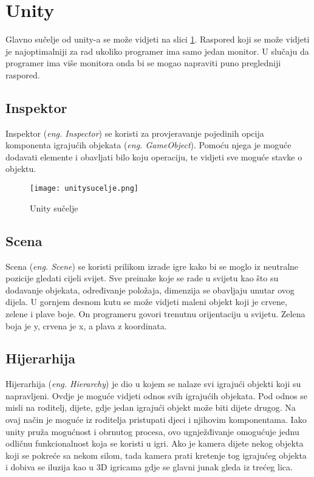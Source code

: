 \section{Unity}
Glavno sučelje od unity-a se može vidjeti na slici \ref{fig:unitysucelje}. Raspored koji se može vidjeti je najoptimalniji za rad ukoliko programer ima samo jedan monitor. U slučaju da programer ima više monitora onda bi se mogao napraviti puno pregledniji raspored. 

\subsection{Inspektor}
Inspektor (\emph{eng. Inspector}) se koristi za provjeravanje pojedinih opcija komponenta igrajućih objekata (\emph{eng. GameObject}). Pomoću njega je moguće dodavati elemente i obavljati bilo koju operaciju, te vidjeti sve moguće stavke o objektu.

\begin{figure}[h]
	\texttt{[image: unitysucelje.png]}
	\centering
	\caption{Unity sučelje}
	\label{fig:unitysucelje}
\end{figure}
\newpage

\subsection{Scena}
Scena (\emph{eng. Scene}) se koristi prilikom izrade igre kako bi se moglo iz neutralne pozicije gledati cijeli svijet. Sve preinake koje se rade u svijetu kao što su dodavanje objekata, određivanje položaja, dimenzija se obavljaju unutar ovog dijela. U gornjem desnom kutu se može vidjeti maleni objekt koji je crvene, zelene i plave boje. On programeru govori trenutnu orijentaciju u svijetu. Zelena boja je y, crvena je x, a plava z koordinata.

\subsection{Hijerarhija}
Hijerarhija (\emph{eng. Hierarchy}) je dio u kojem se nalaze svi igrajući objekti koji su napravljeni. Ovdje je moguće vidjeti odnos svih igrajućih objekata. Pod odnos se misli na roditelj, dijete, gdje jedan igrajući objekt može biti dijete drugog. Na ovaj način je moguće iz roditelja pristupati djeci i njihovim komponentama. Iako unity pruža mogućnost i obrnutog procesa, ovo ugnježđivanje omogućuje jednu odličnu funkcionalnost koja se koristi u igri. Ako je kamera dijete nekog objekta koji se pokreće sa nekom silom, tada kamera prati kretenje tog igrajućeg objekta i dobiva se iluzija kao u 3D igricama gdje se glavni junak gleda iz trećeg lica. 

